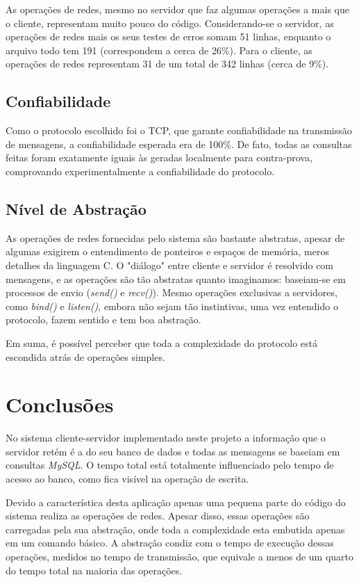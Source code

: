 \documentclass[12pt,a4paper]{article}
\begin{document}
As operações de redes, mesmo no servidor que faz algumas operações a mais que o cliente, representam muito pouco do código. Considerando-se o servidor, as operações de redes mais os seus testes de erros somam 51 linhas, enquanto o arquivo todo tem 191 (correspondem a cerca de 26\%). Para o cliente, as operações de redes representam 31 de um total de 342 linhas (cerca de 9\%). 

\subsection{Confiabilidade}

Como o protocolo escolhido foi o TCP, que garante confiabilidade na transmissão de mensagens, a confiabilidade esperada era de 100\%. De fato, todas as consultas feitas foram exatamente iguais às geradas localmente para contra-prova, comprovando experimentalmente a confiabilidade do protocolo.

\subsection{Nível de Abstração}

As operações de redes fornecidas pelo sistema são bastante abstratas, apesar de algumas exigirem o entendimento de ponteiros e espaços de memória, meros detalhes da linguagem C. O "diálogo" entre cliente e servidor é resolvido com mensagens, e as operações são tão abstratas quanto imaginamos: baseiam-se em processos de envio ({\it send()} e {\it recv()}). Mesmo operações exclusivas a servidores, como {\it bind()} e {\it listen()}, embora não sejam tão instintivas, uma vez entendido o protocolo, fazem sentido e tem boa abstração. 

Em suma, é possível perceber que toda a complexidade do protocolo está escondida atrás de operações simples.

\section{Conclusões}

No sistema cliente-servidor implementado neste projeto a informação que o servidor retém é a do seu banco de dados e todas as mensagens se baseiam em consultas {\it MySQL}. O tempo total está totalmente influenciado pelo tempo de acesso ao banco, como fica visível na operação de escrita.

Devido a característica desta aplicação apenas uma pequena parte do código do sistema realiza as operações de redes. Apesar disso, essas operações são carregadas pela sua abstração, onde toda a complexidade esta embutida apenas em um comando básico. A abstração condiz com o tempo de execução dessas operações, medidos no tempo de transmissão, que equivale a menos de um quarto do tempo total na maioria das operações.
\end{document}
